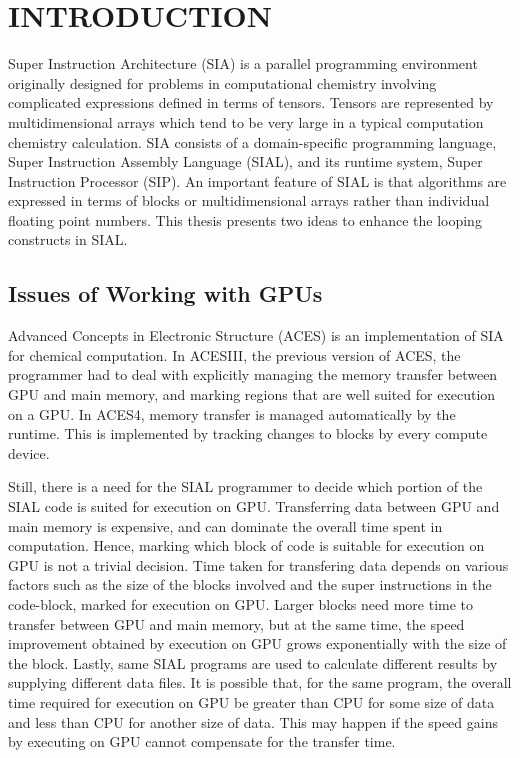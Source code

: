\chapter{INTRODUCTION}\label{intro}
Super Instruction Architecture (SIA) is a parallel programming environment
originally designed for problems in computational chemistry involving complicated
expressions defined in terms of tensors. Tensors are represented by
multidimensional arrays which tend to be very large in a typical computation chemistry
calculation. SIA consists of a
domain-specific programming language, Super Instruction Assembly Language
(SIAL), and its runtime system, Super Instruction Processor (SIP). An important
feature of SIAL is that algorithms are expressed in terms of blocks or
multidimensional arrays rather than individual floating point numbers. This thesis
presents two ideas to enhance the looping constructs in SIAL.

\section{Issues of Working with GPUs}
Advanced Concepts in Electronic Structure (ACES) is an implementation of SIA for
chemical computation.
In ACESIII, the previous version of ACES, the programmer had to deal with explicitly managing
the memory transfer between GPU and main memory, and marking regions that are well suited for execution
on a GPU. In ACES4, memory transfer is managed automatically by the runtime.
This is implemented by tracking changes to blocks by every compute device.

Still, there is a need for the SIAL programmer to decide which portion of the SIAL code
is suited for execution on GPU. Transferring data between GPU and main memory is
expensive\cite{datatransferoptimization}, and can dominate the overall time spent in computation. Hence, marking
which block of code is suitable for execution on GPU is not
a trivial decision. Time taken for transfering data depends on various factors such as
the size of the blocks involved and the super instructions in the code-block, marked
for execution on GPU.
Larger blocks need more time to transfer between GPU and main memory, but at the
same time, the speed improvement obtained by execution on GPU grows
exponentially with the size of the block. Lastly, same SIAL programs are used to
calculate different results by supplying different data files. It is possible that,
for the same program, the overall time required for execution on GPU be greater
than CPU for some size of data and less than CPU for another size of data.
This may happen if the speed gains by executing on GPU cannot compensate for the
transfer time.

